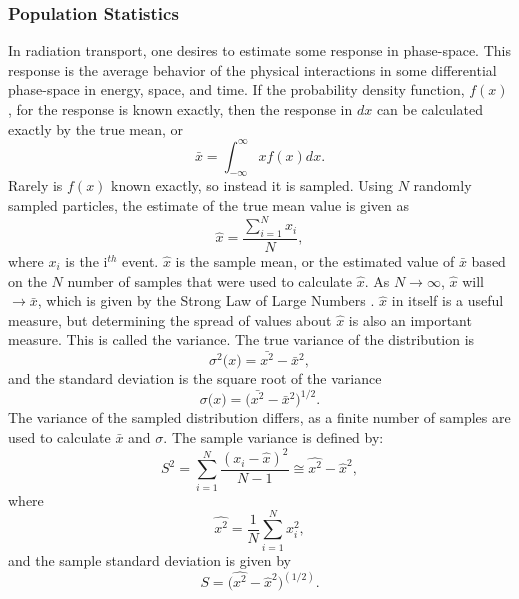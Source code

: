 \subsubsection{Population Statistics}
\label{subsubsec:PopStat}

In radiation transport, one desires to estimate some response in phase-space.
This response is the average behavior of the physical interactions in some
differential phase-space in energy, space, and time. If the probability density
function, $f(x)$, for the response is known exactly,
then the response in $dx$ can be calculated exactly by the true
mean, or
\begin{equation}
  \bar{x} = \int_{-\infty}^{\infty} xf(x) dx .
\end{equation}
Rarely is $f(x)$ known
exactly, so instead it is sampled.
Using $N$ randomly sampled particles, the estimate of the true mean value is given as
\begin{equation}
  \hat{x} = \frac{\sum_{i=1}^{N}{x_i}}{N} ,
\end{equation}
where $x_i$ is the i$^{th}$ event. $\hat{x}$ is the sample mean, or the
estimated value of $\bar{x}$
based on the $N$ number of samples that were used to calculate $\hat{x}$. As $N
\rightarrow \infty$, $\hat{x}$ will $\rightarrow \bar{x}$, which is given by the
Strong Law of Large Numbers \cite{mcnp_manual_v1}.
$\hat{x}$ in itself is a useful measure, but determining the spread of values
about $\hat{x}$ is also an important measure. This is called the variance. The
true variance of the distribution is
\begin{equation}
  \sigma^{2}\big( x \big) = \bar{x^2} - \bar{x}^2 ,
\end{equation}
and the standard deviation is the square root of the variance
\begin{equation}
  \sigma\big(x \big) = \big( \bar{x^2} - \bar{x}^2 \big)^{1/2}.
\end{equation}
The variance of the sampled distribution differs, as a finite number of samples
are used to calculate $\bar{x}$ and $\sigma$. The sample variance is defined by:
\begin{equation}
S^{ 2 }=\sum _{ i=1 }^{ N }{ \frac { (x_{ i }-\hat { x } )^{ 2 } }{ N-1 }  }
             \cong \widehat{x^2}-\hat{x}^2 ,
\label{eq:Var}
\end{equation}
where
\begin{equation}
  \widehat{x^2} = \frac{1}{N}\sum_{i=1}^{N} x_i^2 ,
\end{equation}
and the sample standard deviation is given by
\begin{equation}
  S = \big( \widehat{x^2}-\hat{x}^2 \big)^{(1/2)} .
\end{equation}

